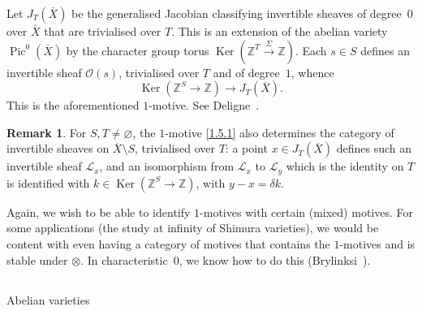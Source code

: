 \documentclass{article}
\theoremstyle{definition}
\newtheorem*{remark}{Remark}
\newcommand{\sh}{\mathscr}
\newcommand{\ZZ}{\mathbb{Z}}
\DeclareMathOperator{\Pic}{Pic}
\DeclareMathOperator{\Ker}{Ker}
\begin{document}
Let $J_T(\overline{X})$ be the generalised Jacobian classifying invertible sheaves of degree~$0$ over $\overline{X}$ that are trivialised over $T$.
This is an extension of the abelian variety $\Pic^0(\overline{X})$ by the character group torus $\Ker(\ZZ^T\xrightarrow{\Sigma}\ZZ)$.
Each $s\in S$ defines an invertible sheaf $\sh{O}(s)$, trivialised over $T$ and of degree~$1$, whence
\[
\label{1.5.1}
  \Ker(\ZZ^S\to\ZZ) \to J_T(\overline{X}).
\tag{1.5.1}
\]
This is the aforementioned $1$-motive.
See Deligne~\cite[§10]{9}.

\begin{remark}
  For $S,T\neq\varnothing$, the $1$-motive \cref{1.5.1} also determines the category of invertible sheaves on $\overline{X}\setminus S$, trivialised over $T$: a point $x\in J_T(\overline{X})$ defines such an invertible sheaf $\sh{L}_x$, and an isomorphism from $\sh{L}_x$ to $\sh{L}_y$ which is the identity on $T$ is identified with $k\in\Ker(\ZZ^S\to\ZZ)$, with $y-x=\delta k$.
\end{remark}

Again, we wish to be able to identify $1$-motives with certain (mixed) motives.
For some applications (the study at infinity of Shimura varieties), we would be content with even having a category of motives that contains the $1$-motives and is stable under $\otimes$.
In characteristic~$0$, we know how to do this (Brylinksi~\cite{7}).


\subsection{}
\label{1.6}

Abelian varieties



\nocite{*}
\end{document}
